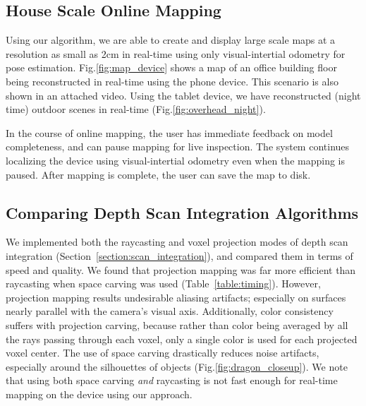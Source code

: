 \documentclass[10pt,twocolumn,letterpaper]{article}
\newcommand{\sref}[1]{Section~\ref{#1}}
\newcommand{\figref}[1]{Fig.\ref{#1}}
\newcommand{\tabref}[1]{Table~\ref{#1}}
\begin{document}
%  
%  
\subsection{House Scale Online Mapping}
\label{section:mapping}
Using our algorithm, we are able to create and display large scale maps at a
resolution as small as 2cm in real-time using only visual-intertial odometry for
pose estimation. \figref{fig:map_device} shows a map of an office building floor
being reconstructed in real-time using the phone device. This scenario is also
shown in an attached video. Using the tablet device, we have reconstructed
(night time) outdoor scenes in real-time (\figref{fig:overhead_night}).

In the course of online mapping, the user has immediate feedback on model
completeness, and can pause mapping for live inspection. The system continues
localizing the device using visual-intertial odometry even when the mapping is
paused. After mapping is complete, the user can save the map to disk.
 
\subsection{Comparing Depth Scan Integration Algorithms} 
\label{section:scan_compare}
We implemented both the raycasting and voxel projection modes of depth scan
integration (\sref{section:scan_integration}), and compared them in terms of
speed and quality. We found that projection mapping was far more efficient than
raycasting when space carving was used (\tabref{table:timing}). However,
projection mapping results undesirable aliasing artifacts; especially on
surfaces nearly parallel with the camera's visual axis. Additionally, color consistency suffers
with projection carving, because rather than color being averaged by all the
rays passing through each voxel, only a single color is used for each projected
voxel center. The use of space carving drastically reduces noise artifacts,
especially around the silhouettes of objects (\figref{fig:dragon_closeup}). We
note that using both space carving \emph{and} raycasting is not fast enough for real-time mapping on the device
using our approach.
\end{document}
